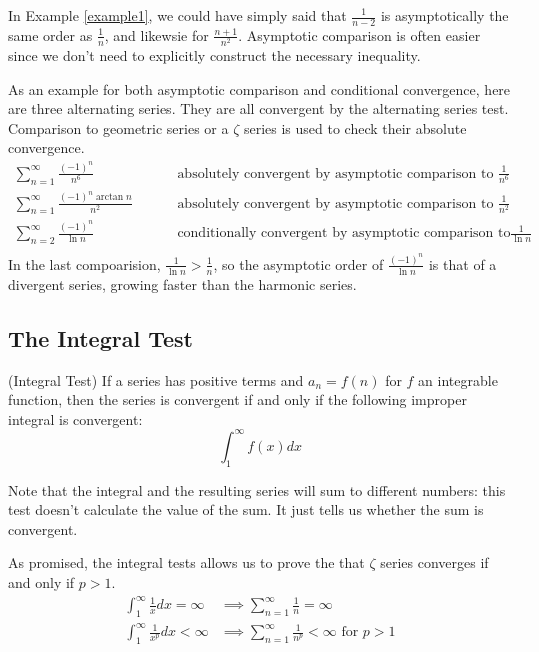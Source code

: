 \documentclass[fleqn]{report}
\begin{document}
In Example \ref{example1}, we could have
simply said that $\frac{1}{n-2}$ is asymptotically the same
order as $\frac{1}{n}$, and likewsie for $\frac{n+1}{n^2}$.
Asymptotic comparison is often easier since we don't need to
explicitly construct the necessary inequality.

\begin{example}As an example for both asymptotic comparison
and conditional convergence, here are three alternating
series. They are all convergent by the alternating series
test. Comparison to geometric series or a $\zeta$ series is used
to check their absolute convergence.
\begin{align*}
\sum_{n=1}^\infty \frac{(-1)^n}{n^6} & \hspace{1cm}
\text{absolutely convergent by asymptotic comparison to }
\frac{1}{n^6} \\
\sum_{n=1}^\infty \frac{(-1)^n \arctan n}{n^2} & \hspace{1cm}
\text{absolutely convergent by asymptotic comparison to }
\frac{1}{n^2} \\
\sum_{n=2}^\infty \frac{(-1)^n}{\ln n} & \hspace{1cm}
\text{conditionally convergent by asymptotic comparison to}
\frac{1}{\ln n} \\
\end{align*}
In the last compoarision, $\frac{1}{\ln n} > \frac{1}{n}$, so
the asymptotic order of $\frac{(-1)^n}{\ln n}$ is that of a
divergent series, growing faster than the harmonic series. 
\end{example}

\subsection{The Integral Test}
\label{integral-test}

\begin{prop}
(Integral Test) If a series has positive terms and
$a_n = f(n)$ for $f$ an integrable function, then the series is
convergent if and only if the following improper integral is convergent:
\begin{equation*}
\int_1^\infty f(x) dx 
\end{equation*}
\end{prop}

Note that the integral and the resulting series will sum to
different numbers: this test doesn't calculate the value of
the sum. It just tells us whether the sum is convergent. 

\begin{example} As promised, the integral tests allows us to
prove the that $\zeta$ series converges if and only if $p>1$.
\begin{align*}
\int_1^\infty \frac{1}{x} dx = \infty & \implies
\sum_{n=1}^\infty \frac{1}{n} = \infty \\
\int_1^\infty \frac{1}{x^p} dx < \infty & \implies
\sum_{n=1}^\infty \frac{1}{n^p} < \infty \text{ for } p > 1
\end{align*}
\end{example}
\end{document}
